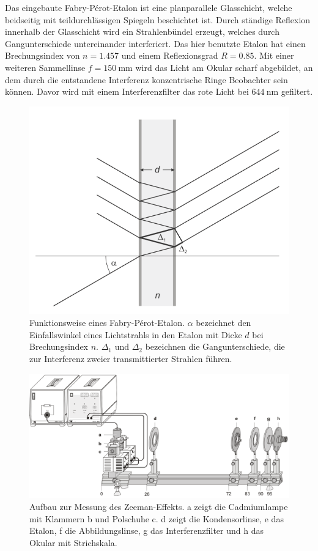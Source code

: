 Das eingebaute Fabry-P\'erot-Etalon ist eine planparallele Glasschicht, welche 
beidseitig mit teildurchlässigen Spiegeln beschichtet ist. Durch ständige Reflexion innerhalb der Glasschicht
wird ein Strahlenbündel erzeugt, welches durch Gangunterschiede untereinander interferiert. 
Das hier benutzte Etalon hat einen Brechungsindex von $n=1.457$ und einem Reflexionsgrad $R=0.85$.
Mit einer weiteren Sammellinse $f=\SI{150}{\mm}$ wird das Licht am Okular scharf abgebildet, an 
dem durch die entstandene Interferenz konzentrische Ringe Beobachter sein können. Davor wird mit einem 
Interferenzfilter das rote Licht bei $\SI{644}{\nm}$ gefiltert.

\begin{figure}[h]
    \centering
    \includegraphics[width=0.6\linewidth]{../figs/etalon}
    \caption{Funktionsweise eines Fabry-P\'erot-Etalon. $\alpha$ bezeichnet den Einfallswinkel 
        eines Lichtstrahls in den Etalon mit Dicke $d$ bei Brechungsindex $n$.
        $\Delta_1$ und $\Delta_2$ bezeichnen die Gangunterschiede, die zur Interferenz zweier 
        transmittierter Strahlen führen.
        \cite{zeeman_handblatt}}
    \label{fig:etalon}
\end{figure}

\begin{figure}[h]
    \centering
    \includegraphics[width=0.7\linewidth]{../figs/zeeman_aufbau}
    \caption{Aufbau zur Messung des Zeeman-Effekts. \abf a zeigt die Cadmiumlampe mit Klammern
        \abf b und Polschuhe \abf c. \abf d zeigt die Kondensorlinse, \abf e das Etalon, \abf f 
        die Abbildungslinse, \abf g das Interferenzfilter und \abf h das Okular mit Strichskala. 
        \cite{zeeman_handblatt}}
    \label{fig:zeeman_aufbau}
\end{figure}

